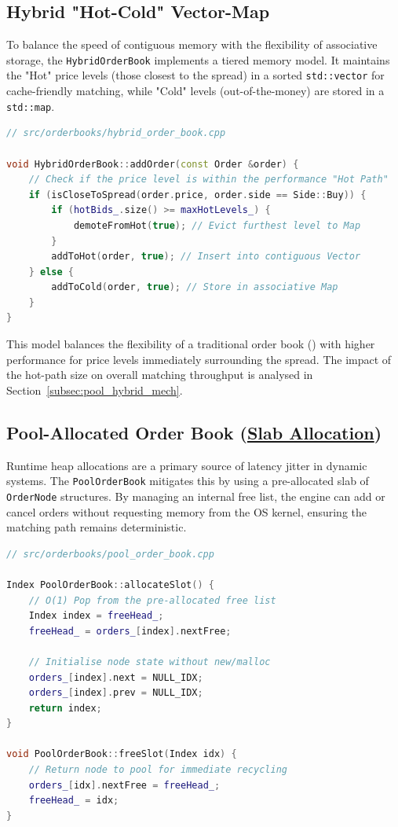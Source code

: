 \subsection{Hybrid "Hot-Cold" Vector-Map}
To balance the speed of contiguous memory with the flexibility of 
associative storage, the \texttt{HybridOrderBook} implements a tiered 
memory model. It maintains the "Hot" price levels (those closest to the 
spread) in a sorted \texttt{std::vector} for cache-friendly matching, while 
"Cold" levels (out-of-the-money) are stored in a \texttt{std::map}.

\begin{lstlisting}[language=C++, caption={Hot/Cold Proximity Check}]
// src/orderbooks/hybrid_order_book.cpp

void HybridOrderBook::addOrder(const Order &order) {
    // Check if the price level is within the performance "Hot Path"
    if (isCloseToSpread(order.price, order.side == Side::Buy)) {
        if (hotBids_.size() >= maxHotLevels_) {
            demoteFromHot(true); // Evict furthest level to Map
        }
        addToHot(order, true); // Insert into contiguous Vector
    } else {
        addToCold(order, true); // Store in associative Map
    }
}
\end{lstlisting}

This model balances the flexibility of a traditional order book () 
with higher performance for price levels immediately surrounding the 
spread. The impact of the hot-path size on overall matching throughput 
is analysed in Section~\ref{subsec:pool_hybrid_mech}.

\subsection{Pool-Allocated Order Book (\hyperref[app:glossary]{Slab Allocation})}
Runtime heap allocations are a primary source of latency jitter in 
dynamic systems. The \texttt{PoolOrderBook} mitigates this by using 
a pre-allocated slab of \texttt{OrderNode} structures. By managing an 
internal free list, the engine can add or cancel orders without requesting 
memory from the OS kernel, ensuring the matching path remains 
deterministic.

\begin{lstlisting}[language=C++, caption={Slab-Allocation and Free List Management}, label={lst:slab_allocation}]
// src/orderbooks/pool_order_book.cpp

Index PoolOrderBook::allocateSlot() {
    // O(1) Pop from the pre-allocated free list
    Index index = freeHead_;
    freeHead_ = orders_[index].nextFree;
    
    // Initialise node state without new/malloc
    orders_[index].next = NULL_IDX;
    orders_[index].prev = NULL_IDX;
    return index;
}

void PoolOrderBook::freeSlot(Index idx) {
    // Return node to pool for immediate recycling
    orders_[idx].nextFree = freeHead_;
    freeHead_ = idx;
}
\end{lstlisting}

